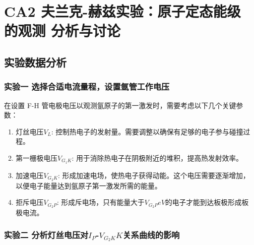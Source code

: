 \documentclass[dvipsnames, svgnames,a4paper,11pt]{article}
\begin{document}
\section{CA2 \quad 夫兰克-赫兹实验：原子定态能级的观测 \quad\heiti 分析与讨论}

\subsection{实验数据分析}


	\subsubsection{实验一 \quad 选择合适电流量程，设置氩管工作电压}
		
		在设置 F-H 管电极电压以观测氩原子的第一激发时，需要考虑以下几个关键参数：

		\begin{enumerate}
			\item 灯丝电压$V_L$: 控制热电子的发射量。需要调整以确保有足够的电子参与碰撞过程。
			\item 第一栅极电压$V_{G_1K}$: 用于消除热电子在阴极附近的堆积，提高热发射效率。
			\item 加速电压$V_{G_2K}$: 形成加速电场，使热电子获得动能。这个电压需要逐渐增加，以便电子能量达到氩原子第一激发所需的能量。
			\item 拒斥电压$V_{G_2P}$: 形成斥电场，只有能量大于$  V_{G_2P}eV$的电子才能到达板极形成板极电流。
		\end{enumerate}

		

		


	\subsubsection{实验二 \quad 分析灯丝电压对$I_P$-$V_{G_2K}K$关系曲线的影响}
\end{document}
